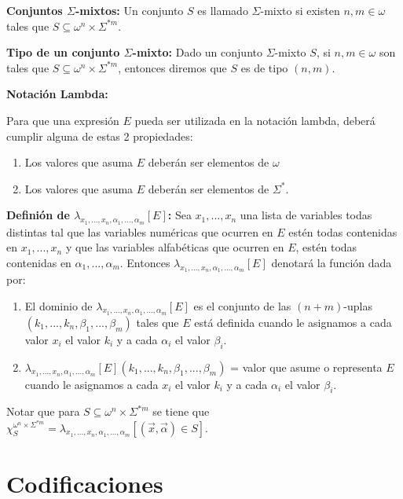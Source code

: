 \documentclass{article}
\begin{document}
\begin{flushleft}
\textbf{Conjuntos $\Sigma$-mixtos:} Un conjunto $S$ es llamado $\Sigma$-mixto si existen $n, m \in \omega$ tales que $S \subseteq \omega^n \times \Sigma^{*m}$.\linebreak

\textbf{Tipo de un conjunto $\Sigma$-mixto:} Dado un conjunto $\Sigma$-mixto $S$, si $n, m \in \omega$ son tales que $S \subseteq \omega^n \times \Sigma^{*m}$, entonces diremos que $S$ es de tipo $(n, m)$.\linebreak

\textbf{Notación Lambda:} \linebreak

Para que una expresión $E$ pueda ser utilizada en la notación lambda, deberá cumplir alguna de estas 2 propiedades:
\begin{enumerate}
    \item Los valores que asuma $E$ deberán ser elementos de $\omega$
    \item Los valores que asuma $E$ deberán ser elementos de $\Sigma^*$.
\end{enumerate}

\textbf{Definión de $\lambda_{x_1, ..., x_n, \alpha_1, ..., \alpha_m}[E]$:} Sea $x_1, ..., x_n$ una lista de variables todas distintas tal que las variables numéricas que ocurren en $E$ estén todas contenidas en $x_1, ..., x_n$ y que las variables alfabéticas que ocurren en $E$, estén todas contenidas en $\alpha_1, ..., \alpha_m$. Entonces $\lambda_{x_1, ..., x_n, \alpha_1, ..., \alpha_m}[E]$ denotará la función dada por:
\begin{enumerate}
    \item El dominio de $\lambda_{x_1, ..., x_n, \alpha_1, ..., \alpha_m}[E]$ es el conjunto de las $(n+m)$-uplas $(k_1, ..., k_n, \beta_1, ..., \beta_m)$ tales que $E$ está definida cuando le asignamos a cada valor $x_i$ el valor $k_i$ y a cada $\alpha_i$ el valor $\beta_i$.
    \item $\lambda_{x_1, ..., x_n, \alpha_1, ..., \alpha_m}[E](k_1, ..., k_n, \beta_1, ..., \beta_m)$ = valor que asume o representa $E$ cuando le asignamos a cada $x_i$ el valor $k_i$ y a cada $\alpha_i$ el valor $\beta_i$.
\end{enumerate}

Notar que para $S \subseteq \omega^n \times \Sigma^{*m}$ se tiene que $\chi_S^{\omega^n \times \Sigma^{*m}} = \lambda_{x_1, ..., x_n, \alpha_1, ..., \alpha_m}[(\overrightarrow{x}, \overrightarrow{\alpha}) \in S]$.\pagebreak

\section{Codificaciones}


\end{flushleft}
\end{document}
